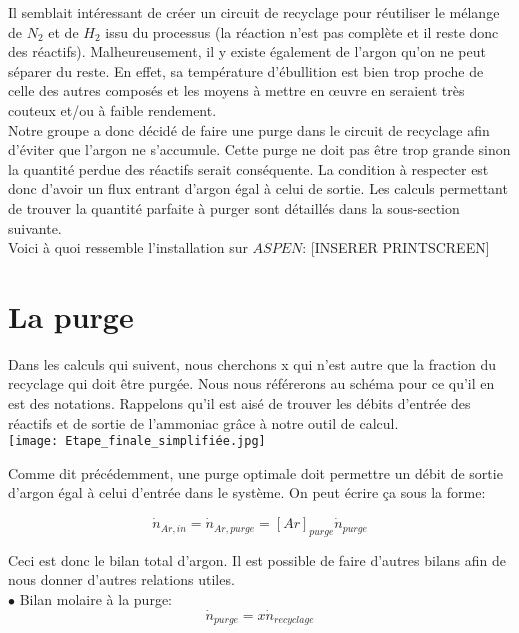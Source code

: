 \documentclass[a4paper, oneside, 12pt]{article}
\begin{document}
Il semblait intéressant de créer un circuit de recyclage pour réutiliser le mélange de $N_2$ et de $H_2$ issu du processus (la réaction n'est pas complète et il reste donc des réactifs). Malheureusement, il y existe également de l'argon qu'on ne peut séparer du reste. En effet, sa température d'ébullition est bien trop proche de celle des autres composés et les moyens à mettre en œuvre en seraient très couteux et/ou à faible rendement. \\
Notre groupe a donc décidé de faire une purge dans le circuit de recyclage afin d'éviter que l'argon ne s'accumule. Cette purge ne doit pas être trop grande sinon la quantité perdue des réactifs serait conséquente. La condition à respecter est donc d'avoir un flux entrant d'argon égal à celui de sortie. Les calculs permettant de trouver la quantité parfaite à purger sont détaillés dans la sous-section suivante.\\
Voici à quoi ressemble l'installation sur $ASPEN$:
[INSERER PRINTSCREEN]

\section{La purge}

Dans les calculs qui suivent, nous cherchons x qui n'est autre que la fraction du recyclage qui doit être purgée. Nous nous référerons au schéma pour ce qu'il en est des notations. Rappelons qu'il est aisé de trouver les débits d'entrée des réactifs et de sortie de l'ammoniac grâce à notre outil de calcul.\\

\texttt{[image: Etape\_finale\_simplifiée.jpg]} 

Comme dit précédemment, une purge optimale doit permettre un débit de sortie d'argon égal à celui d'entrée dans le système. On peut écrire ça sous la forme:

\begin{equation}
\dot{n}_{Ar,in}=\dot{n}_{Ar,purge}=[Ar]_{purge} \dot{n}_{purge}
\end{equation}

Ceci est donc le bilan total d'argon. Il est possible de faire d'autres bilans afin de nous donner d'autres relations utiles.\\

$\bullet$ Bilan molaire à la purge:
\begin{equation}
\dot{n}_{purge}=x \dot{n}_{recyclage}
\end{equation}
\end{document}
